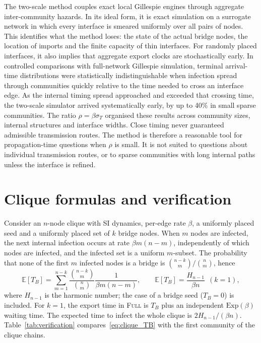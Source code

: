\documentclass[a4paper,fleqn]{cas-sc}
\newcommand{\Exp}{\mathrm{Exp}}
\newcommand{\Full}{\textup{\textsc{Full}}}
\begin{document}
The two-scale method couples exact local Gillespie engines through aggregate inter-community hazards. In its ideal form, it is exact simulation on a surrogate network in which every interface is smeared uniformly over all pairs of nodes. This identifies what the method loses: the state of the actual bridge nodes, the location of imports and the finite capacity of thin interfaces. For randomly placed interfaces, it also implies that aggregate export clocks are stochastically early. In controlled comparisons with full-network Gillespie simulation, terminal arrival-time distributions were statistically indistinguishable when infection spread through communities quickly relative to the time needed to cross an interface edge. As the internal timing spread approached and exceeded that crossing time, the two-scale simulator arrived systematically early, by up to 40\% in small sparse communities. The ratio $\rho=\beta\sigma_T$ organised these results across community sizes, internal structures and interface widths. Close timing never guaranteed admissible transmission routes. The method is therefore a reasonable tool for propagation-time questions when $\rho$ is small. It is not suited to questions about individual transmission routes, or to sparse communities with long internal paths unless the interface is refined.

\appendix

\section{Clique formulas and verification}
\label{app:clique}

Consider an $n$-node clique with SI dynamics, per-edge rate $\beta$, a uniformly placed seed and a uniformly placed set of $k$ bridge nodes. When $m$ nodes are infected, the next internal infection occurs at rate $\beta m(n-m)$, independently of which nodes are infected, and the infected set is a uniform $m$-subset. The probability that none of the first $m$ infected nodes is a bridge is $\binom{n-k}{m}/\binom{n}{m}$, hence
\begin{equation}
\label{eq:clique_TB}
\mathbb{E}[T_B]=\sum_{m=1}^{n-k}\frac{\binom{n-k}{m}}{\binom{n}{m}}\frac{1}{\beta m(n-m)},
\qquad
\mathbb{E}[T_B]=\frac{H_{n-1}}{\beta n}\ \ (k=1),
\end{equation}
where $H_{n-1}$ is the harmonic number; the case of a bridge seed ($T_B=0$) is included. For $k=1$, the export time in \Full{} is $T_B$ plus an independent $\Exp(\beta)$ waiting time. The expected time to infect the whole clique is $2H_{n-1}/(\beta n)$. Table~\ref{tab:verification} compares~\eqref{eq:clique_TB} with the first community of the clique chains.
\end{document}
